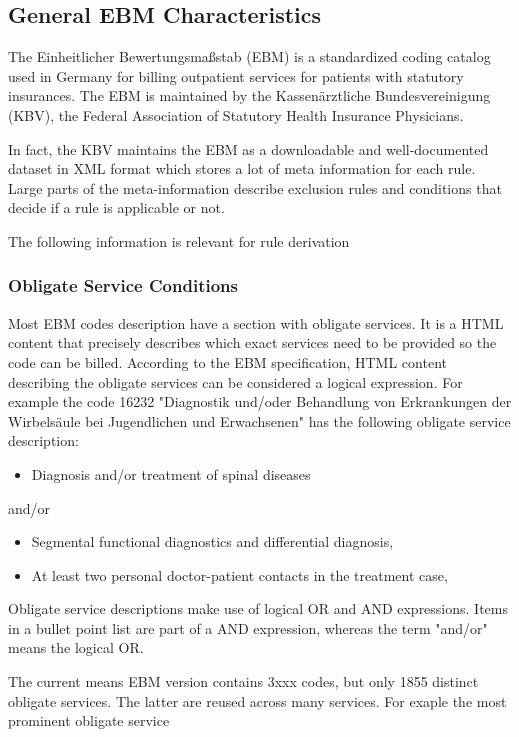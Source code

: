 \subsection{General EBM Characteristics}\label{subsec:general-ebm-characteristics}
The Einheitlicher Bewertungsmaßstab (EBM) is a standardized coding catalog used in Germany for billing outpatient services for patients with statutory insurances.
The EBM is maintained by the Kassenärztliche Bundesvereinigung (KBV), the Federal Association of Statutory Health Insurance Physicians\cite[]{hermanns2015ebm}.

In fact, the KBV maintains the EBM as a downloadable and well-documented dataset in XML format which stores a lot of meta information for each rule.
Large parts of the meta-information describe exclusion rules and conditions that decide if a rule is applicable or not.

The following information is relevant for rule derivation



\subsubsection{Obligate Service Conditions}\label{subsubsec:obligate-service-conditions}
Most EBM codes description have a section with obligate services.
It is a HTML content that precisely describes which exact services need to be provided so the code can be billed.
According to the EBM specification, HTML content describing the obligate services can be considered a logical expression.
For example the code 16232 "Diagnostik und/oder Behandlung von Erkrankungen der Wirbelsäule bei Jugendlichen und Erwachsenen" has the following obligate service description:


\begin{itemize}
    \item Diagnosis and/or treatment of spinal diseases
\end{itemize}
and/or
\begin{itemize}
    \item Segmental functional diagnostics and differential diagnosis,
    \item At least two personal doctor-patient contacts in the treatment case,
\end{itemize}

Obligate service descriptions make use of logical OR and AND expressions.
Items in a bullet point list are part of a AND expression, whereas the term "and/or" means the logical OR.

The current means EBM version contains 3xxx codes, but only 1855 distinct obligate services.
The latter are reused across many services. For exaple the most prominent obligate service
